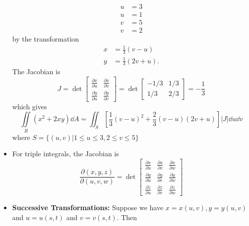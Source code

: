 \begin{itemize}
\begin{example}
        \begin{align}
            u &= 3 \\ 
            u &= 1 \\ 
            v &= 5 \\ 
            v &= 2
        \end{align}
        by the transformation 
        \begin{align}
            x &= \frac{1}{3}(v-u) \\ 
            y &= \frac{1}{3}(2v+u).
        \end{align}
        The Jacobian is 
        \begin{equation}
            J = \det \begin{bmatrix}
                \frac{\partial x}{\partial u} & \frac{\partial x}{\partial v} \\ 
                \frac{\partial y}{\partial u} & \frac{\partial y}{\partial v}
            \end{bmatrix} = \det\begin{bmatrix}
                -1/3 & 1/3 \\ 
                1/3 & 2/3
            \end{bmatrix} = -\frac{1}{3}
        \end{equation}
        which gives 
        \begin{equation}
            \iint\limits_R (x^2+2xy)\dd{A} = \iint_S \left[\frac{1}{3}(v-u)^2+\frac{2}{3}(v-u)(2v+u)\right]|J| \dd{u}\dd{v}
        \end{equation}
        where $S=\{(u,v)| 1 \le u \le 3, 2 \le v\le 5\}$
    \end{example}
    \item For triple integrals, the Jacobian is 
    \begin{equation}
        \frac{\partial (x,y,z)}{\partial (u,v,w)} = \det \begin{bmatrix}
            \frac{\partial x}{\partial u} & \frac{\partial x}{\partial v} & \frac{\partial x}{\partial w} \\ 
            \frac{\partial y}{\partial u} & \frac{\partial y}{\partial v} & \frac{\partial y}{\partial w} \\ 
            \frac{\partial z}{\partial u} & \frac{\partial z}{\partial v} & \frac{\partial z}{\partial w}
        \end{bmatrix}
    \end{equation}
    \item \textbf{Successive Transformations:} Suppose we have $x=x(u,v), y=y(u,v)$ and $u=u(s,t)$ and $v=v(s,t).$ Then

\end{itemize}
